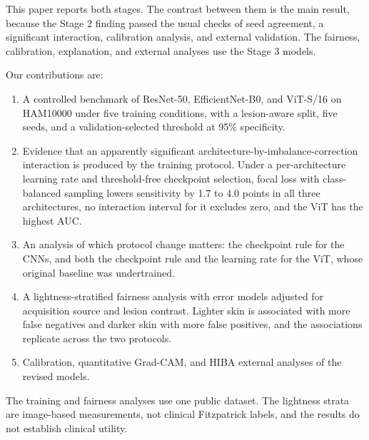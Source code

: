 This paper reports both stages. The contrast between them is the main result, because the Stage 2 finding passed the usual checks of seed agreement, a significant interaction, calibration analysis, and external validation. The fairness, calibration, explanation, and external analyses use the Stage 3 models.

Our contributions are:

\begin{enumerate}
  \item A controlled benchmark of ResNet-50, EfficientNet-B0, and ViT-S/16 on HAM10000 under five training conditions, with a lesion-aware split, five seeds, and a validation-selected threshold at 95\% specificity.
  \item Evidence that an apparently significant architecture-by-imbalance-correction interaction is produced by the training protocol. Under a per-architecture learning rate and threshold-free checkpoint selection, focal loss with class-balanced sampling lowers sensitivity by 1.7 to 4.0 points in all three architectures, no interaction interval for it excludes zero, and the ViT has the highest AUC.
  \item An analysis of which protocol change matters: the checkpoint rule for the CNNs, and both the checkpoint rule and the learning rate for the ViT, whose original baseline was undertrained.
  \item A lightness-stratified fairness analysis with error models adjusted for acquisition source and lesion contrast. Lighter skin is associated with more false negatives and darker skin with more false positives, and the associations replicate across the two protocols.
  \item Calibration, quantitative Grad-CAM, and HIBA external analyses of the revised models.
\end{enumerate}

The training and fairness analyses use one public dataset. The lightness strata are image-based measurements, not clinical Fitzpatrick labels, and the results do not establish clinical utility.
